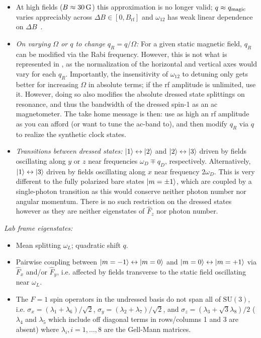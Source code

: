 \documentclass[aps,prl,reprint,superscriptaddress,floatfix]{revtex4-1}
\begin{document}
\begin{itemize}
        \item At high fields ($B\approx \unit[30]{G}$) this approximation is no longer valid; $q \approx q_{\text{magic}}$ varies appreciably across $\Delta B \in [0, B_{\text{rf}}]$ and $\omega_{12}$ has weak linear dependence on $\Delta B$~\cite{lundblad_synthetic_2017}.
    \item \textit{On varying $\Omega$ or $q$ to change $q_R=q/\Omega$:}
    For a given static magnetic field, $q_R$ can be modified via the Rabi frequency.
    However, this is not what is represented in , as the normalization of the horizontal and vertical axes would vary for each $q_R$.
    Importantly, the insensitivity of $\omega_{12}$ to detuning only gets better for increasing $\Omega$ in absolute terms; if the rf amplitude is unlimited, use it.
    However, doing so also modifies the absolute dressed state splittings on resonance, and thus the bandwidth of the dressed spin-1 as an ac magnetometer.
    The take home message is then: use as high an rf amplitude as you can afford (or want to tune the ac-band to), and then modify $q_R$ via $q$ to realize the synthetic clock states.
    \item \textit{Transitions between dressed states:} $\vert 1 \rangle  \leftrightarrow \vert 2 \rangle $ and $\vert 2 \rangle  \leftrightarrow \vert 3 \rangle $ driven by fields oscillating along $y$ or $z$ near frequencies $\omega_D \mp q_D$, respectively.
    Alternatively, $\vert 1 \rangle  \leftrightarrow \vert 3 \rangle $ driven by fields oscillating along $x$ near frequency $2\omega_D$.
    This is very different to the fully polarized bare states $\vert m=\pm 1 \rangle $, which are coupled by a single-photon transition as this would conserve neither photon number nor angular momentum.
    There is no such restriction on the dressed states however as they are neither eigenstates of $\hat{F}_z$ nor photon number. 
\end{itemize}
\textit{Lab frame eigenstates:}
\begin{itemize}
    \item Mean splitting $\omega_L$; quadratic shift $q$.
    \item Pairwise coupling between $\vert m=-1 \rangle  \leftrightarrow \vert m=0 \rangle $ and $\vert m=0 \rangle  \leftrightarrow \vert m=+1 \rangle $ via $\hat{F}_x$ and/or $\hat{F}_y$, i.e. affected by fields transverse to the static field oscillating near $\omega_L$.
    \item The $F=1$ spin operators in the undressed basis do not span all of $\text{SU}(3)$, i.e. $\sigma_x = (\lambda_1 + \lambda_6)/\sqrt{2}$, $\sigma_y = (\lambda_2 + \lambda_7)/\sqrt{2}$, and $\sigma_z = (\lambda_3 + \sqrt{3} \lambda_8)/2$ ($\lambda_4$ and $\lambda_5$ which include off diagonal terms in rows/columns 1 and 3 are absent) where $\lambda_i, i = 1,\dots,8$ are the Gell-Mann matrices.
\end{itemize}
\end{document}

